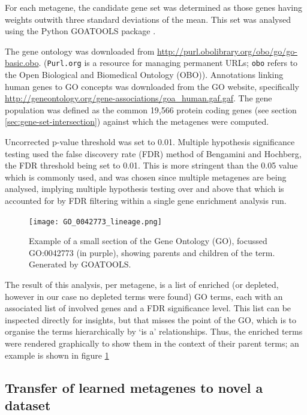 \documentclass[draft,tikz, 12pt,a4paper,oneside,fleqn]{article}
\begin{document}
For each metagene, the candidate gene set was determined as those genes having weights outwith three standard deviations of the mean.   This set was analysed using the Python GOATOOLS package \cite{Klopfenstein2018}.   

The gene ontology was downloaded from \url{http://purl.obolibrary.org/obo/go/go-basic.obo}.  ({\tt Purl.org} is a resource for managing permanent URLs; {\tt obo} refers to the Open Biological and Biomedical Ontology (OBO)).  
Annotations linking human genes to GO concepts was downloaded from the GO website, specifically \url{http://geneontology.org/gene-associations/goa_human.gaf.gaf}.   
The gene population was defined as the common 19,566 protein coding genes (see section \ref{sec:gene-set-intersection}) against which the metagenes were computed.  

Uncorrected p-value threshold was set to 0.01.
Multiple hypothesis significance testing used the false discovery rate (FDR) method of Bengamini and Hochberg, the FDR threshold being set to 0.01.  This is more stringent than the 0.05 value which is commonly used, and was chosen since multiple metagenes are being analysed, implying multiple hypothesis testing over and above that which is accounted for by FDR filtering within a single gene enrichment analysis run.

\begin{figure}[htb!]
\begin{center}
\texttt{[image: GO\_0042773\_lineage.png]}
\caption{Example of a small section of the Gene Ontology (GO), focussed GO:0042773 (in purple), showing parents and children of the term.   Generated by GOATOOLS.}
\label{fig-eg_go_graphic}
\end{center}
\end{figure}

The result of this analysis, per metagene, is a list of enriched (or depleted, however in our case no depleted terms were found) GO terms, each with an associated list of involved genes and a FDR significance level.   This list can be inspected directly for insights, but that misses the point of the GO, which is to organise the terms hierarchically by `is a' relationships.   Thus, the enriched terms were rendered graphically to show them in the context of their parent terms; an example is shown in figure \ref{fig-eg_go_graphic}


\subsection{Transfer of learned metagenes to novel a dataset}
\label{sec-transfer-to-novel}
\end{document}
